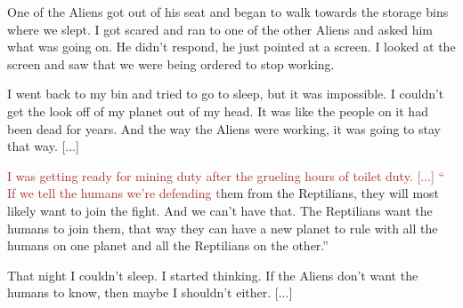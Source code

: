\begin{breakablefigure}
\begin{tcolorbox}[colback=gray!10, colframe=black!75, title={\textbf{Prefix:} Prompt + 256 characters}, width=\textwidth]
 One of the Aliens got out of his seat and began to walk towards the storage bins where we slept. I got scared and ran to one of the other Aliens and asked him what was going on. He didn't respond, he just pointed at a screen. I looked at the screen and saw that we were being ordered to stop working. 
 
 I went back to my bin and tried to go to sleep, but it was impossible. I couldn't get the look off of my planet out of my head. It was like the people on it had been dead for years. And the way the Aliens were working, it was going to stay that way.  [...] 
            \end{tcolorbox}
            \begin{tcolorbox}[colback=gray!10, colframe=black!75, title={\textbf{Prefix:} Prompt + 1024 characters}, width=\textwidth]
\textcolor{brown}{I was getting ready for mining duty after the grueling hours of toilet duty. [...] `` If we tell the humans we're defending t}hem from the Reptilians, they will most likely want to join the fight. And we can't have that. The Reptilians want the humans to join them, that way they can have a new planet to rule with all the humans on one planet and all the Reptilians on the other.'' 
 
 That night I couldn't sleep. I started thinking. If the Aliens don't want the humans to know, then maybe I shouldn't either.  [...]
            \end{tcolorbox}

        \label{fig:app-cpfuse-prefix-example}
\end{breakablefigure}

\FloatBarrier
